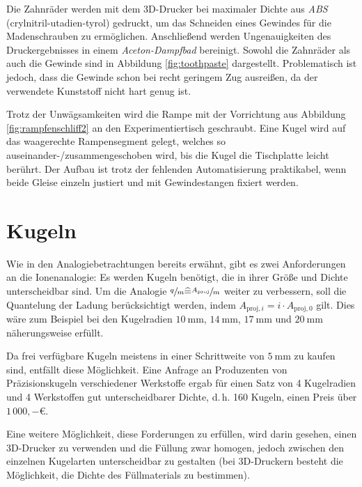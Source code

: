 

Die Zahnräder werden mit dem 3D-Drucker bei maximaler Dichte aus \textit{ABS} (crylnitril-utadien-tyrol) gedruckt, um das Schneiden eines Gewindes für die Madenschrauben zu ermöglichen. Anschließend werden Ungenauigkeiten des Druckergebnisses in einem \textit{Aceton-Dampfbad} bereinigt. Sowohl die Zahnräder als auch die Gewinde sind in Abbildung \ref{fig:toothpaste} dargestellt. Problematisch ist jedoch, dass die Gewinde schon bei recht geringem Zug ausreißen, da der verwendete Kunststoff nicht hart genug ist.

Trotz der Unwägsamkeiten wird die Rampe mit der Vorrichtung aus Abbildung \ref{fig:rampfenschliff2} an den Experimentiertisch geschraubt. Eine Kugel wird auf das waagerechte Rampensegment gelegt, welches so auseinander-/zusammengeschoben wird, bis die Kugel die Tischplatte leicht berührt. Der Aufbau ist trotz der fehlenden Automatisierung praktikabel, wenn beide Gleise einzeln justiert und mit Gewindestangen fixiert werden.



\section{Kugeln}
\label{sec:balls}

Wie in den Analogiebetrachtungen bereits erwähnt, gibt es zwei Anforderungen an die Ionenanalogie: Es werden Kugeln benötigt, die in ihrer Größe und Dichte unterscheidbar sind. Um die Analogie $\sfrac{q}{m}\widehat{=}\sfrac{A_\mathrm{proj}}{m}$ weiter zu verbessern, soll die Quantelung der Ladung berücksichtigt werden, indem $A_{\mathrm{proj},i}=i\cdot A_{\mathrm{proj},0}$ gilt. Dies wäre zum Beispiel bei den Kugelradien $\SI{10}{\milli\metre}$, $\SI{14}{\milli\metre}$, $\SI{17}{\milli\metre}$ und $\SI{20}{\milli\metre}$ näherungsweise erfüllt.

Da frei verfügbare Kugeln meistens in einer Schrittweite von $\SI{5}{\milli\metre}$ zu kaufen sind, entfällt diese Möglichkeit. Eine Anfrage an Produzenten von Präzisionskugeln verschiedener Werkstoffe ergab für einen Satz von 4 Kugelradien und 4 Werkstoffen gut unterscheidbarer Dichte, d.\,h. 160 Kugeln, einen Preis über $1\,000,-\euro$. 

Eine weitere Möglichkeit, diese Forderungen zu erfüllen, wird darin gesehen, einen 3D-Drucker zu verwenden und die Füllung zwar homogen, jedoch zwischen den einzelnen Kugelarten unterscheidbar zu gestalten (bei 3D-Druckern besteht die Möglichkeit, die Dichte des Füllmaterials zu bestimmen). 

